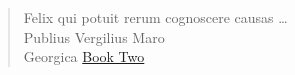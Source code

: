 \documentclass{beamer}
\begin{document}
\begin{frame}{}


  \begin{columns}
    \begin{column}{0.8\textwidth}
  \begin{quote}
Felix qui potuit rerum cognoscere
causas \dots \\
    \hfill \small \textnormal{Publius Vergilius Maro \\ \hfill Georgica \href{https://www.poetryintranslation.com/PITBR/Latin/VirgilGeorgicsII.php}{Book Two}}
  \end{quote}
    \end{column}
    \begin{column}{0.4\textwidth}
      \begin{figure}

\end{figure}
\end{column}
\end{columns}
\end{frame}
\end{document}
